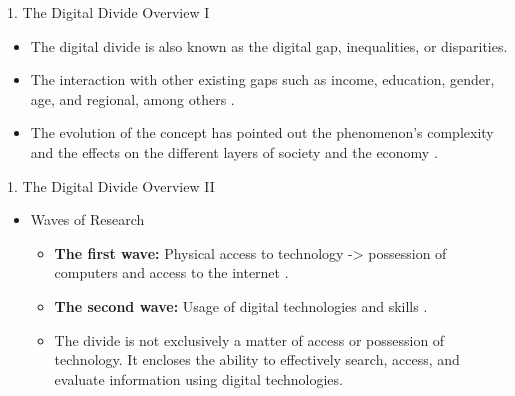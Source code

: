 \documentclass[
  ignorenonframetext,
]{beamer}
\providecommand{\tightlist}{%
  \setlength{\itemsep}{0pt}\setlength{\parskip}{0pt}}
\begin{document}
\begin{frame}{1. The Digital Divide Overview I}
\protect\hypertarget{the-digital-divide-overview-i}{}
\begin{itemize}
\tightlist
\item
  The digital divide is also known as the digital gap, inequalities, or
  disparities.
\item
  The interaction with other existing gaps such as income, education,
  gender, age, and regional, among others \citep{ragnedda2017}.
\item
  The evolution of the concept has pointed out the phenomenon's
  complexity and the effects on the different layers of society and the
  economy \citep{vandijk2003, ragnedda2017, shakina2021}.
\end{itemize}
\end{frame}

\begin{frame}{1. The Digital Divide Overview II}
\protect\hypertarget{the-digital-divide-overview-ii}{}
\begin{itemize}
\tightlist
\item
  Waves of Research

  \begin{itemize}
  \item
    \textbf{The first wave:} Physical access to technology
    -\textgreater{} possession of computers and access to the internet
    \citep{norris2001, james2002, castells2003}.
  \item
    \textbf{The second wave:} Usage of digital technologies and skills
    \citep{hargittai2002b, vandijk2005b, vandijk2006c, vandeursen2011c}.
  \item
    The divide is not exclusively a matter of access or possession of
    technology. It encloses the ability to effectively search, access,
    and evaluate information using digital technologies.
  \end{itemize}
\end{itemize}
\end{frame}
\end{document}
